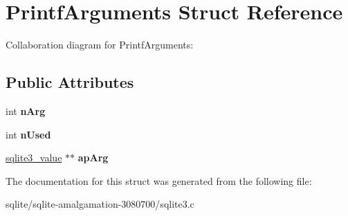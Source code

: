 \hypertarget{struct_printf_arguments}{\section{Printf\+Arguments Struct Reference}
\label{struct_printf_arguments}
}


Collaboration diagram for Printf\+Arguments\+:
\subsection*{Public Attributes}
\begin{DoxyCompactItemize}
\item 
\hypertarget{struct_printf_arguments_a8f4465ebae2de254882c3253f0f01993}{int {\bfseries n\+Arg}}\label{struct_printf_arguments_a8f4465ebae2de254882c3253f0f01993}

\item 
\hypertarget{struct_printf_arguments_a686ce8f8451154f2ffd7b91cd0908327}{int {\bfseries n\+Used}}\label{struct_printf_arguments_a686ce8f8451154f2ffd7b91cd0908327}

\item 
\hypertarget{struct_printf_arguments_a78d20f483184bdb3c0abdeca93f1dd2d}{\hyperlink{struct_mem}{sqlite3\+\_\+value} $\ast$$\ast$ {\bfseries ap\+Arg}}\label{struct_printf_arguments_a78d20f483184bdb3c0abdeca93f1dd2d}

\end{DoxyCompactItemize}


The documentation for this struct was generated from the following file\+:\begin{DoxyCompactItemize}
\item 
sqlite/sqlite-\/amalgamation-\/3080700/sqlite3.\+c\end{DoxyCompactItemize}
